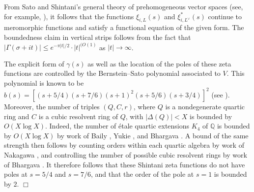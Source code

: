 \documentclass{article}
\def\ra{{\rightarrow}}
\def\Q{{\mathbb Q}}
\def\Q{{\mathbb Q}}
\newenvironment{proof}{\noindent {\bf Proof:}}{$\Box$ \vspace{2 ex}}
\begin{document}
\begin{proof}
From Sato and Shintani's general theory of prehomogeneous vector spaces (see, for example, \cite[Theorem 5.18]{Kimura_book}), it follows that the functions $\xi_{i,L}(s)$ and $\xi_{i,L^\vee}^{*}(s)$ continue to meromorphic functions and satisfy a functional equation of the given form. The boundedness claim in vertical strips follows from the fact that $|\Gamma(\sigma+it)|\leq e^{-\pi|t|/2}\cdot |t|^{(O(1)}$ as $|t|\ra\infty$. 


The explicit form of $\gamma(s)$ as well as the location of the poles of these zeta functions are controlled by the Bernstein--Sato polynomial associated to $V$. This polynomial is known to be $b(s)=[(s+5/4)(s+7/6)(s+1)^2(s+5/6)(s+3/4)]^2$ (see \cite{MR648417}). Moreover, the number of triples $(Q,C,r)$, where $Q$ is a nondegenerate quartic ring and $C$ is a cubic resolvent ring of $Q$, with $|\Delta(Q)|<X$ is bounded by $O(X\log X)$. Indeed, the number of \'etale quartic extensions $K_4$ of $\Q$ is bounded by $O(X\log X)$ by work of Baily \cite{Baily}, Yukie \cite{Yukie}, and Bhargava \cite{dodqf}. A bound of the same strength then follows by counting orders within each quartic algebra by work of Nakagawa \cite{MR1342021}, and controlling the number of possible cubic resolvent rings by work of Bhargava \cite{BHCL3}. It therefore follows that these Shintani zeta functions do not have poles at $s=5/4$ and $s=7/6$, and that the order of the pole at $s=1$ is bounded by $2$.
\end{proof}
\end{document}
